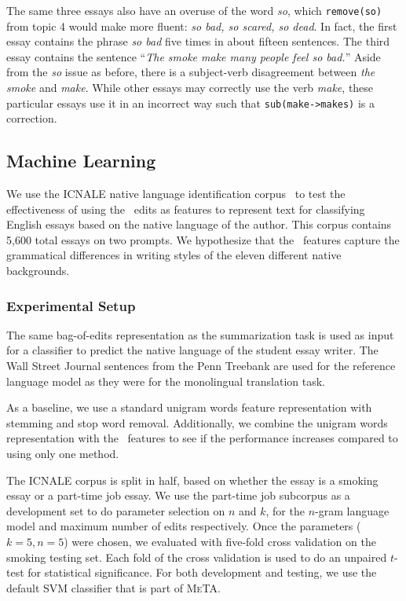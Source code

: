 The same three essays also have an overuse of the word \emph{so}, which
\texttt{remove(so)} from topic 4 would make more fluent: \emph{so bad, so
scared, so dead}. In fact, the first essay contains the phrase \emph{so bad}
five times in about fifteen sentences. The third essay contains the sentence
``\emph{The smoke make many people feel so bad.}'' Aside from the \emph{so}
issue as before, there is a subject-verb disagreement between \emph{the smoke}
and \emph{make}. While other essays may correctly use the verb \emph{make},
these particular essays use it in an incorrect way such that
\texttt{sub(make->makes)} is a correction.

\subsection{Machine Learning}

We use the ICNALE native language identification corpus~\cite{icnale} to test
the effectiveness of using the \sd~edits as features to represent text for
classifying English essays based on the native language of the author. This
corpus contains 5,600 total essays on two prompts. We hypothesize that the
\sd~features capture the grammatical differences in writing styles of the eleven
different native backgrounds.

\subsubsection{Experimental Setup}

The same bag-of-edits representation as the summarization task is used as input
for a classifier to predict the native language of the student essay writer. The
Wall Street Journal sentences from the Penn Treebank are used for the
reference language model as they were for the monolingual translation task.

As a baseline, we use a standard unigram words feature representation with
stemming and stop word removal. Additionally, we combine the unigram words
representation with the \sd~features to see if the performance increases
compared to using only one method.

The ICNALE corpus is split in half, based on whether the essay is a smoking
essay or a part-time job essay. We use the part-time job subcorpus as a
development set to do parameter selection on $n$ and $k$, for the $n$-gram
language model and maximum number of edits respectively. Once the parameters
($k=5,n=5$) were chosen, we evaluated with five-fold cross validation on the
smoking testing set. Each fold of the cross validation is used to do an unpaired
$t$-test for statistical significance. For both development and testing, we use
the default SVM classifier that is part of \textsc{MeTA}. 

